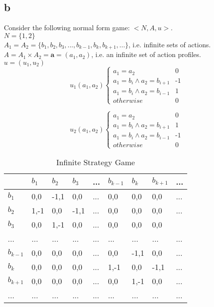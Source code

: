 \documentclass[10pt,a4paper]{article}
\begin{document}
\subsection*{b}
Consider the following normal form game: $<N,A,u>$.\\
$N=\{1,2\}$\\
$A_1=A_2=\{b_1,b_2,b_3,...,b_{k-1},b_{k},b_{k+1},...\}$, i.e. infinite sets of actions.
$A=A_1\times A_2=\textbf{a}=(a_1,a_2)$, i.e. an infinite set of action profiles.\\
$u=(u_1,u_2)$\\
\begin{equation*}
u_1(a_1,a_2) \begin{cases}
a_1=a_2 & \text{0}\\
a_1=b_i \land a_2=b_{i+1} & \text{-1}\\
a_1=b_i \land a_2=b_{i-1} & \text{1}\\
otherwise & \text{0}
\end{cases}
\end{equation*}

\begin{equation*}
u_2(a_1,a_2) \begin{cases}
a_1=a_2 & \text{0}\\
a_1=b_i \land a_2=b_{i+1} & \text{1}\\
a_1=b_i \land a_2=b_{i-1} & \text{-1}\\
otherwise & \text{0}
\end{cases}
\end{equation*}

\begin{table}[h]
\centering
\caption{Infinite Strategy Game}
\begin{tabular}{|l|l|l|l|l|l|l|l|l|}
\hline
          & $b_1$ & $b_2$ & $b_3$ & ... & $b_{k-1}$ & $b_{k}$ & $b_{k+1}$ & ... \\ \hline
$b_1$     & 0,0   & -1,1  & 0,0   & ... & 0,0       & 0,0     & 0,0       & ... \\ \hline
$b_2$     & 1,-1  & 0,0   & -1,1  & ... & 0,0       & 0,0     & 0,0       & ... \\ \hline
$b_3$     & 0,0   & 1,-1  & 0,0   & ... & 0,0       & 0,0     & 0,0       &     \\ \hline
...       & ...   & ...   & ...   & ... & ...       & ...     & ...       & ... \\ \hline
$b_{k-1}$ & 0,0   & 0,0   & 0,0   & ... & 0,0       & -1,1    & 0,0       & ... \\ \hline
$b_{k}$   & 0,0   & 0,0   & 0,0   & ... & 1,-1      & 0,0     & -1,1      & ... \\ \hline
$b_{k+1}$ & 0,0   & 0,0   & 0,0   & ... & 0,0       & 1,-1    & 0,0       & ... \\ \hline
...       & ...   & ...   & ...   & ... & ...       & ...     & ...       & ... \\ \hline
\end{tabular}
\end{table}
\end{document}
